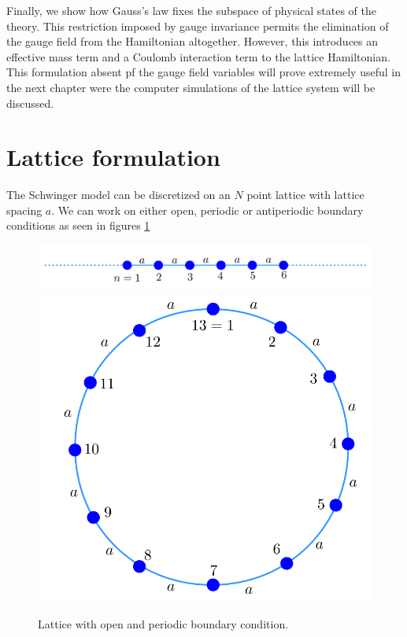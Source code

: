 Finally, we show how Gauss's law fixes the subspace of physical states of the theory. This restriction imposed by gauge invariance permits the elimination of the gauge field from the Hamiltonian altogether. However, this introduces an effective mass term and a Coulomb interaction term to the lattice Hamiltonian. This formulation absent pf the gauge field variables will prove extremely useful in the next chapter were the computer simulations of the lattice system will be discussed.

\section{Lattice formulation}\label{sec:latticeFormulation}

The Schwinger model can be discretized on an $N$ point lattice with lattice spacing $a$. We can work on either open, periodic or antiperiodic boundary conditions as seen in figures \ref{fig:latticeCond}

 \begin{figure}[htb]
     \centering
     \includegraphics[scale=0.35]{figures/latice1.png}
     \centering
     \includegraphics[scale=0.3]{figures/latice2.png}
    \caption{Lattice with open and periodic boundary condition.}
     \label{fig:latticeCond}
 \end{figure}
 

